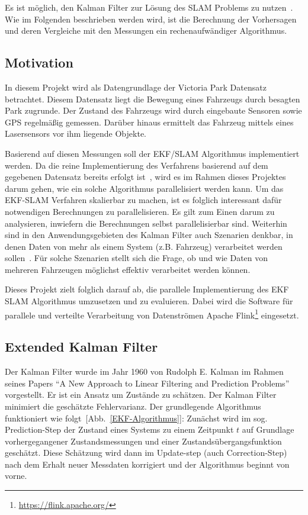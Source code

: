 \documentclass[11pt]{article}
\begin{document}
Es ist möglich, den Kalman Filter zur Lösung des  SLAM Problems zu nutzen~\cite{freiburg_SLAM}. Wie im Folgenden beschrieben werden wird, ist die Berechnung der Vorhersagen und deren Vergleiche mit den Messungen ein rech\-en\-auf\-wän\-di\-ger Algorithmus.

\subsection{Motivation}
In diesem Projekt wird als Datengrundlage der Victoria Park Datensatz betrachtet. Diesem Datensatz liegt die Bewegung eines Fahrzeugs durch besagten Park zugrunde. Der Zustand des Fahrzeugs wird durch eingebaute Sensoren sowie GPS regelmäßig gemessen. Darüber hinaus ermittelt das Fahrzeug mittels eines Lasersensors vor ihm liegende Objekte.

Basierend auf diesen Messungen soll der EKF/SLAM Algorithmus implementiert werden. Da die reine Implementierung des Verfahrens basierend auf dem gegebenen Datensatz bereits erfolgt ist~\cite{ute_SLAM}, wird es im Rahmen dieses Projektes darum gehen, wie ein solche Algorithmus parallelisiert werden kann. Um das EKF-SLAM Verfahren skalierbar zu machen, ist es folglich interessant dafür notwendigen Berechnungen zu parallelisieren. Es gilt zum Einen darum zu analysieren, inwiefern die Berechnungen selbst parallelisierbar sind. Weiterhin sind in den Anwendungsgebieten des Kalman Filter auch Szenarien denkbar, in denen Daten von mehr als einem System (z.B. Fahrzeug) verarbeitet werden sollen~\cite{vessel}. Für solche Szenarien stellt sich die Frage, ob  und wie Daten von mehreren Fahrzeugen möglichst effektiv verarbeitet werden können.

Dieses Projekt zielt folglich darauf ab, die parallele Implementierung des EKF SLAM Algorithmus umzusetzen und zu evaluieren. Dabei wird die Software für parallele und verteilte Verarbeitung von Datenströmen Apache Flink\footnote{\url{https://flink.apache.org/}} eingesetzt.

\subsection{Extended Kalman Filter}
Der Kalman Filter wurde im Jahr 1960 von Rudolph E. Kalman im Rahmen seines Papers “A New Approach to Linear Filtering and Prediction Problems”~\cite{kalman1960new} vorgestellt. Er ist ein Ansatz um Zustände zu schätzen. Der Kalman Filter minimiert die geschätzte Fehlervarianz. Der grundlegende Algorithmus funktioniert wie folgt~[Abb.~\ref{EKF-Algorithmus}]: Zunächst wird im sog. Prediction-Step der Zustand eines Systems zu einem Zeitpunkt $t$ auf Grundlage vorhergegangener Zustandsmessungen und einer Zustandsübergangsfunktion geschätzt. Diese Schätzung wird dann im Update-step (auch Correction-Step) nach dem Erhalt neuer Messdaten korrigiert und der Algorithmus beginnt von vorne.
\end{document}
